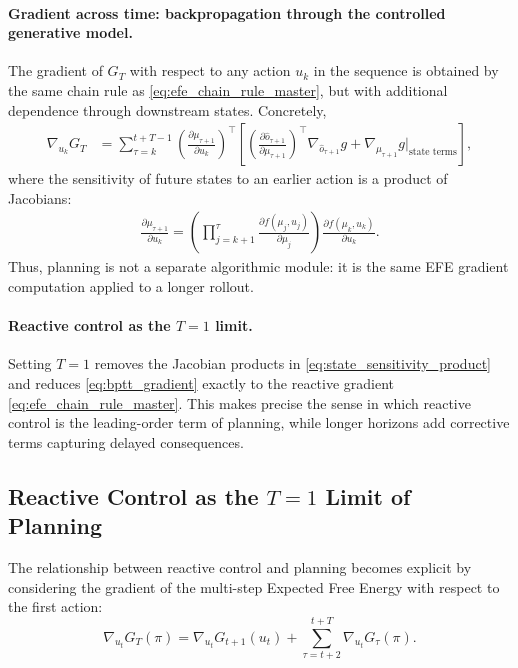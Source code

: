 \documentclass[a4paper, twoside]{article}
\begin{document}
\paragraph{Gradient across time: backpropagation through the controlled generative model.}
The gradient of $G_T$ with respect to any action $u_k$ in the sequence is obtained by the same chain rule as \eqref{eq:efe_chain_rule_master}, but with additional dependence through downstream states. Concretely,
\begin{align}
\nabla_{u_k}G_T
&=
\sum_{\tau=k}^{t+T-1}
\left(\frac{\partial \mu_{\tau+1}}{\partial u_k}\right)^\top
\left[
\left(\frac{\partial \hat o_{\tau+1}}{\partial \mu_{\tau+1}}\right)^\top
\nabla_{\hat o_{\tau+1}} g
+
\nabla_{\mu_{\tau+1}} g\Big|_{\text{state terms}}
\right],
\label{eq:bptt_gradient}
\end{align}
where the sensitivity of future states to an earlier action is a product of Jacobians:
\begin{align}
\frac{\partial \mu_{\tau+1}}{\partial u_k}
=
\left(
\prod_{j=k+1}^{\tau}
\frac{\partial f(\mu_j,u_j)}{\partial \mu_j}
\right)
\frac{\partial f(\mu_k,u_k)}{\partial u_k}.
\label{eq:state_sensitivity_product}
\end{align}
Thus, planning is not a separate algorithmic module: it is the same EFE gradient computation applied to a longer rollout.

\paragraph{Reactive control as the $T=1$ limit.}
Setting $T=1$ removes the Jacobian products in \eqref{eq:state_sensitivity_product} and reduces \eqref{eq:bptt_gradient} exactly to the reactive gradient \eqref{eq:efe_chain_rule_master}. This makes precise the sense in which reactive control is the leading-order term of planning, while longer horizons add corrective terms capturing delayed consequences.


\subsection{Reactive Control as the $T=1$ Limit of Planning}

The relationship between reactive control and planning becomes explicit by
considering the gradient of the multi-step Expected Free Energy with respect to
the first action:
\begin{equation}
\nabla_{u_t} G_T(\pi)
=
\nabla_{u_t} G_{t+1}(u_t)
+
\sum_{\tau=t+2}^{t+T} \nabla_{u_t} G_\tau(\pi).
\end{equation}
\end{document}
